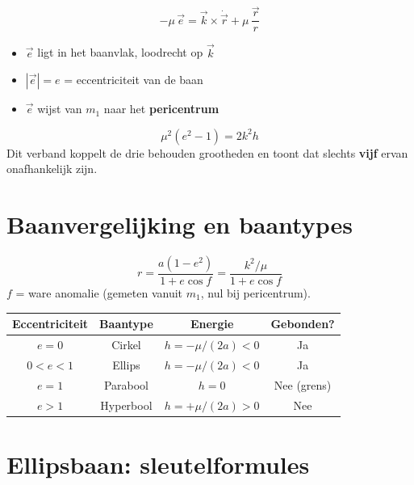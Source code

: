 \documentclass[11pt, a4paper]{article}
\begin{document}
\begin{formule}
\[
  -\mu\,\vec{e} = \vec{k} \times \dot{\vec{r}} + \mu\,\frac{\vec{r}}{r}
\]
\begin{itemize}[leftmargin=1.5em, itemsep=1pt]
  \item $\vec{e}$ ligt in het baanvlak, loodrecht op $\vec{k}$
  \item $|\vec{e}| = e$ = eccentriciteit van de baan
  \item $\vec{e}$ wijst van $m_1$ naar het \textbf{pericentrum}
\end{itemize}
\end{formule}

\begin{afleiding}
\[
  \mu^2(e^2 - 1) = 2k^2 h
\]
Dit verband koppelt de drie behouden grootheden en toont dat slechts \textbf{vijf} ervan onafhankelijk zijn.
\end{afleiding}

\section{Baanvergelijking en baantypes}

\begin{formule}
\[
  \boxed{r = \frac{a(1-e^2)}{1 + e\cos f} = \frac{k^2/\mu}{1 + e\cos f}}
\]
$f$ = ware anomalie (gemeten vanuit $m_1$, nul bij pericentrum).
\end{formule}

\begin{center}
\renewcommand{\arraystretch}{1.5}
\begin{tabular}{cccc}
\toprule
\textbf{Eccentriciteit} & \textbf{Baantype} & \textbf{Energie} & \textbf{Gebonden?} \\
\midrule
$e = 0$ & Cirkel & $h = -\mu/(2a) < 0$ & Ja \\
$0 < e < 1$ & Ellips & $h = -\mu/(2a) < 0$ & Ja \\
$e = 1$ & Parabool & $h = 0$ & Nee (grens) \\
$e > 1$ & Hyperbool & $h = +\mu/(2a) > 0$ & Nee \\
\bottomrule
\end{tabular}
\end{center}

\section{Ellipsbaan: sleutelformules}
\end{document}
